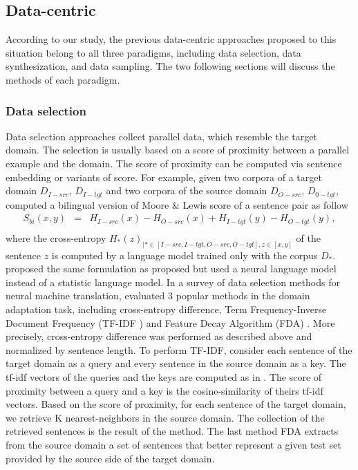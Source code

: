 \subsection{Data-centric}
\label{ssec:case-2-data}
According to our study, the previous data-centric approaches proposed to this situation belong to all three paradigms, including data selection, data synthesization, and data sampling. The two following sections will discuss the methods of each paradigm.
\subsubsection{Data selection}
Data selection approaches collect parallel data, which resemble the target domain. The selection is usually based on a score of proximity between a parallel example and the domain. The score of proximity can be computed via sentence embedding or variants of \citeauthor{Moore10intelligent} score. For example, given two corpora of a target domain $D_{I-src}$, $D_{I-tgt}$ and two corpora of the source domain $D_{O-src}$, $D_{0-tgt}$, \cite{Axelrod11domain} computed a bilingual version of Moore $\&$ Lewis score of a sentence pair as follow
\begin{equation}
\begin{array}{rcl}
S_{bi} (x,y) &=& H_{I-src}(x) - H_{O-src}(x) + H_{I-tgt}(y) - H_{O-tgt}(y), \\
\end{array}
\label{eq:ced}
\end{equation}
where the cross-entropy $H_{*}(z)_{| * \in [I-src, I-tgt, O-src, O-tgt], z \in [x,y]}$ of the sentence $z$ is computed by a language model trained only with the corpus $D_{*}$. \citet{Duh13adaptation} proposed the same formulation as proposed \citet{Axelrod11domain} but used a neural language model instead of a statistic language model. In a survey of data selection methods for neural machine translation, \citet{Silva18extracting} evaluated 3 popular methods in the domain adaptation task, including cross-entropy difference, Term Frequency-Inverse Document Frequency (TF-IDF ) \citep{Salton73On} and Feature Decay Algorithm (FDA) \citep{Poncelas18Feature}. More precisely, cross-entropy difference was performed as described above and normalized by sentence length. To perform TF-IDF, \citet{Silva18extracting} consider each sentence of the target domain as a query and every sentence in the source domain as a key. The tf-idf vectors of the queries and the keys are computed as in \citet{Salton73On}. The score of proximity between a query and a key is the cosine-similarity of theirs tf-idf vectors. Based on the score of proximity, for each sentence of the target domain, we retrieve K nearest-neighbors in the source domain. The collection of the retrieved sentences is the result of the method. The last method FDA extracts from the source domain a set of sentences that better represent a given test set provided by the source side of the target domain. 

